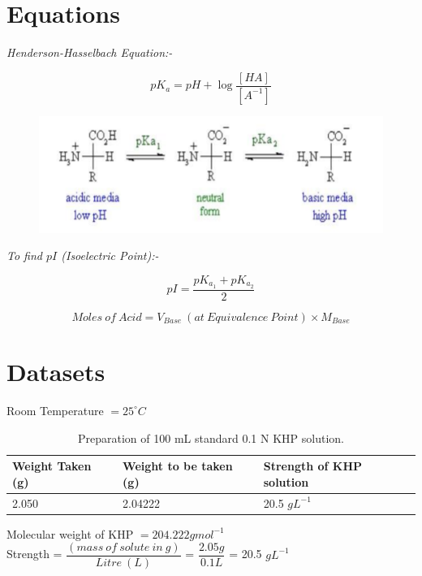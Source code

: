 \documentclass[12pt]{article}
\begin{document}
	\section{Equations}
	
	\emph{Henderson-Hasselbach Equation:-}
	
	$$pK_{a} = pH + \log\frac{[HA]}{[A^{-1}]}$$
	
	\begin{figure}[H]
		\centering
		\includegraphics[scale=0.6]{picture}
	\end{figure}

	\emph{To find $pI$ (Isoelectric Point):-}
	
	$$pI = \frac{pK_{a_{1}} + pK_{a_{2}}}{2}$$
	
	$$Moles\ of\ Acid = V_{Base}\ (at\ Equivalence\ Point) \times M_{Base}$$
	
	\section{Datasets}
	
	Room Temperature $= 25^{\circ}C$
	
	\begin{table}[H]
		\centering
		\begin{tabular}{|l|l|l|}
			\hline
			Weight Taken (g) & Weight to be taken (g) & Strength of KHP solution \\ \hline
			2.050            & 2.04222                & 20.5 $gL^{-1}$             \\ \hline
		\end{tabular}
	\caption{ Preparation of 100 
		mL standard 0.1 N KHP 
		solution.}
	\end{table}

	Molecular weight of KHP $= 204.222 gmol^{-1}$\\
	Strength = $\dfrac{(mass\ of\ solute\ in\ g)}{Litre\ (L)}$ = $\dfrac{2.05 g}{0.1 L}$ = 20.5 $gL^{-1}$
	
\end{document}
